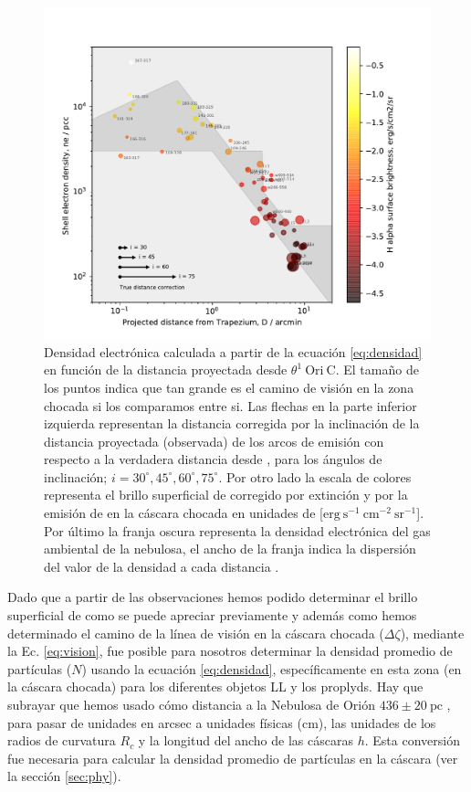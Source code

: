 \begin{figure}
  \centering
   \includegraphics[width=\linewidth, clip]{luis-programas/will-nshell-vs-D.pdf}
  \caption{Densidad electrónica calculada a partir de la ecuación \ref{eq:densidad} en función de la distancia proyectada desde \(\theta^1\ \text{Ori}\ \text{C}\). El tamaño de los puntos indica que tan grande es el camino de visión en la zona chocada si los comparamos entre si. Las flechas en la parte inferior izquierda representan la distancia corregida por la inclinación de la distancia proyectada (observada) de los arcos de emisión con respecto a la verdadera distancia desde \thC{}, para los ángulos de inclinación; \(i = 30^{\circ}, 45^{\circ}, 60^{\circ}, 75^{\circ}\). Por otro lado la escala de colores representa el brillo superficial de \ha{} corregido por extinción y por la emisión de \nii{} en la cáscara chocada en unidades de [\(\mathrm{erg~s^{-1}~cm^{-2}~sr^{-1}}\)]. Por último la franja oscura representa la densidad electrónica del gas ambiental de la nebulosa, el ancho de la franja indica la dispersión del valor de la densidad a cada distancia \citep{Odell:2010, Mesa:2008}.}
  \label{fig:density}
\end{figure}

Dado que a partir de las observaciones hemos podido determinar el brillo superficial de \ha{} como se puede apreciar previamente y además como hemos determinado el camino de la línea de visión en la cáscara chocada (\(\Delta\zeta\)), mediante la Ec. \ref{eq:vision}, fue posible para nosotros determinar la densidad promedio de partículas (\(N\)) usando la ecuación \ref{eq:densidad}, específicamente en esta zona (en la cáscara chocada) para los diferentes objetos LL y los proplyds. Hay que subrayar que hemos usado cómo distancia a la Nebulosa de Orión \(436 \pm 20~\text{pc}\) \citep{Odell:2008}, para pasar  de unidades en arcsec a unidades físicas (cm), las unidades de los radios de curvatura \(R_{c}\) y la longitud del ancho de las cáscaras \(h\). Esta conversión fue necesaria para calcular la densidad promedio de partículas en la cáscara (ver la sección \ref{sec:phy}).\\

